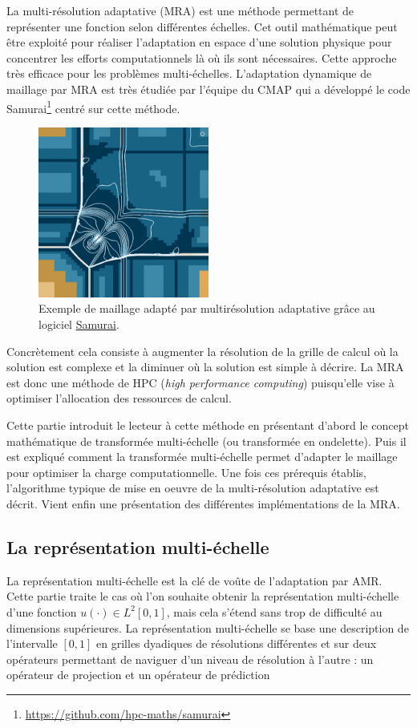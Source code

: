 La multi-résolution adaptative (MRA) est une méthode permettant de représenter une fonction selon différentes échelles.
Cet outil mathématique peut être exploité pour réaliser l'adaptation en espace d'une solution physique pour concentrer les efforts computationnels là où ils sont nécessaires. 
Cette approche très efficace pour les problèmes multi-échelles.
L'adaptation dynamique de maillage par MRA est très étudiée par l'équipe du CMAP qui a développé le code Samurai\footnote{\href{https://github.com/hpc-maths/samurai}{https://github.com/hpc-maths/samurai}}
centré sur cette méthode.
\begin{figure}[h]
    \centering
    \includegraphics[width=0.5\textwidth]{media/3_/3_/exemple_compression_samurai.png}
    \caption{Exemple de maillage adapté par multirésolution adaptative grâce au logiciel \href{https://github.com/hpc-maths/samurai}{Samurai}.}
    \label{fig:samurai}
\end{figure}
Concrètement cela consiste à augmenter la résolution de la grille de calcul où la solution est complexe et la diminuer où la solution est simple à décrire.
La MRA est donc une méthode de HPC (\textit{high performance computing}) puisqu'elle vise à optimiser l'allocation des ressources de calcul.\par
Cette partie introduit le lecteur à cette méthode en présentant d'abord le concept mathématique de transformée multi-échelle (ou transformée en ondelette). 
Puis il est expliqué comment la transformée multi-échelle permet d'adapter le maillage pour optimiser la charge computationnelle.
Une fois ces prérequis établis, l'algorithme typique de mise en oeuvre de la multi-résolution adaptative est décrit.
Vient enfin une présentation des différentes implémentations de la MRA.

\subsection{La représentation multi-échelle}
    La représentation multi-échelle est la clé de voûte de l'adaptation par AMR.
    Cette partie traite le cas où l'on souhaite obtenir la représentation multi-échelle d'une fonction $u(\cdot) \in L^2{[0,1]}$, 
    mais cela s'étend sans trop de difficulté au dimensions supérieures.
    La représentation multi-échelle se base une description de l'intervalle $[0,1]$ en grilles dyadiques de résolutions différentes
    et sur deux opérateurs permettant de naviguer d'un niveau de résolution à l'autre : un opérateur de projection et un opérateur de prédiction
